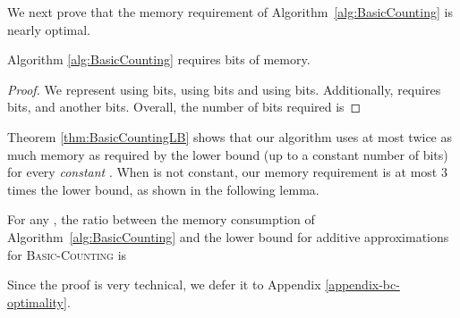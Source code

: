 We next prove that the memory requirement of Algorithm~\ref{alg:BasicCounting} is nearly optimal.
\begin{theorem}
\label{thm:counting-memory}
Algorithm \ref{alg:BasicCounting} requires
 bits of memory.
\end{theorem}

\begin{proof}
We represent  using  bits,  using
 bits and  using  bits.
Additionally,  requires  bits, and  another  bits.
Overall, the number of bits required is

\end{proof}

Theorem \ref{thm:BasicCountingLB} shows that our algorithm uses at most twice as much memory as required by the lower bound (up to a constant number of bits) for every \emph{constant} .
When  is not constant, our memory requirement is at most 3 times the lower bound, as shown in the following lemma.

\begin{corollary}
\label{lemma:algorithm-ratio}
For any , the ratio between the memory consumption of Algorithm~\ref{alg:BasicCounting} and the lower bound for additive approximations for \textsc{Basic-Counting} is

\end{corollary}

Since the proof is very technical, we defer it to Appendix \ref{appendix-bc-optimality}.
